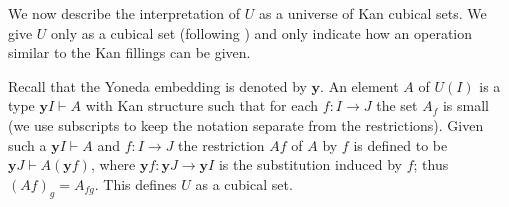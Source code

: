 \documentclass[a4paper,USenglish,draft]{lipics}
\newcommand{\CC}{{\mathcal C}}
\newcommand{\yoneda}{\mathbf{y}}
\newcommand{\rup}[1]{#1{\uparrow}}
\newcommand{\rdo}[1]{#1{\downarrow}}
\newcommand{\OO}{O}
\begin{document}


We now describe the interpretation of $U$ as a universe of Kan cubical
sets.  We give $U$ only as a cubical set (following
\cite{HofmannStreicher,Street}) and only indicate how an operation
similar to the Kan fillings can be given.

Recall that the Yoneda embedding is denoted by $\yoneda$.  An
element $A$ of $U(I)$ is a type $\yoneda I \vdash A$ with Kan
structure such that for each $f \colon I \to J$ the set $A_f$ is small
(we use subscripts to keep the notation separate from the
restrictions).  Given such a $\yoneda I \vdash A$ and $f \colon I \to
J$ the restriction $A f$ of $A$ by $f$ is defined to be $\yoneda J
\vdash A (\yoneda f)$, where $\yoneda f \colon \yoneda J \to \yoneda
I$ is the substitution induced by $f$; thus $(A f)_g = A_{f g}$.  This
defines $U$ as a cubical set.

\end{document}
